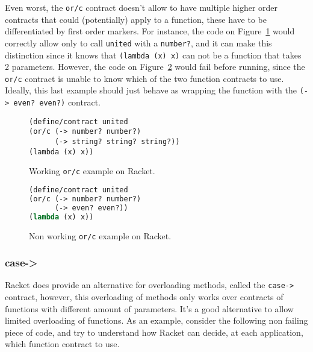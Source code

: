 \documentclass[sigplan,10pt,review,anonymous]{acmart}
\newcommand{\unsure}[2][1=]{}
\newcommand{\racket}[1]{\lstinline[language=racket]{#1}}
\begin{document}
Even worst, the \racket{or/c} contract doesn't allow to have multiple higher order
contracts that could (potentially) apply to a function, these have to be
differentiated by first order markers.
For instance, the code on Figure~\ref{code:racket:or/c:working}
would correctly allow only to call
\racket{united} with a \racket{number?},
and it can make this distinction since it knows that
\racket{(lambda (x) x)} can not be a function that takes 2 parameters.
However, the code on Figure~\ref{code:racket:or/c:non-working} would fail
before running, since the \racket{or/c} contract is unable to know
which of the two function contracts to use.
Ideally, this last example should just behave as wrapping
the function with the \racket{(-> even? even?)} contract.

\begin{figure}[h]

\begin{lstlisting}[language=racket]
(define/contract united
(or/c (-> number? number?)
      (-> string? string? string?))
(lambda (x) x))
\end{lstlisting}
\caption{Working \racket{or/c} example on Racket.}
\label{code:racket:or/c:working}

\end{figure}

\begin{figure}[h]

\begin{lstlisting}[language=lisp]
(define/contract united
(or/c (-> number? number?)
      (-> even? even?))
(lambda (x) x))
\end{lstlisting}
\caption{Non working \racket{or/c} example on Racket.}
\label{code:racket:or/c:non-working}

\end{figure}


\unsure{This section is overall a bit hard to follow. I
  think I've figured out what it means, but it needs more love. Also
  give an example which doesn't work and one that does for or/c.}

\subsubsection{case->}

Racket does provide an alternative for overloading methods, called the
\racket{case->} contract, however, this overloading of methods only
works over contracts of functions with different amount of parameters.
It's a good alternative to allow limited overloading of functions.
As an example, consider the following non failing piece of code, and
try to understand how Racket can decide, at each application,
which function contract to use.
\end{document}

